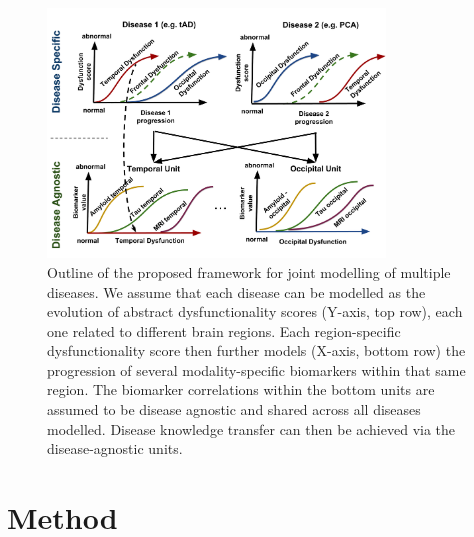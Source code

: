 \documentclass{llncs}
\begin{document}
% 
% 
% 
%


\begin{figure}[h]
 \centering
 \includegraphics[width=0.8\textwidth,trim=0 0 0 0,clip]{figures/disease_knowledge_transfer.pdf}
 \caption{Outline of the proposed framework for joint modelling of multiple diseases. We assume that each disease can be modelled as the evolution of abstract dysfunctionality scores (Y-axis, top row), each one related to different brain regions. Each region-specific dysfunctionality score then further models (X-axis, bottom row) the progression of several modality-specific biomarkers within that same region. The biomarker correlations within the bottom units are assumed to be disease agnostic and shared across all diseases modelled. Disease knowledge transfer can then be achieved via the disease-agnostic units.}
 \label{fig:diagram}
\end{figure}

\section{Method}
\end{document}
